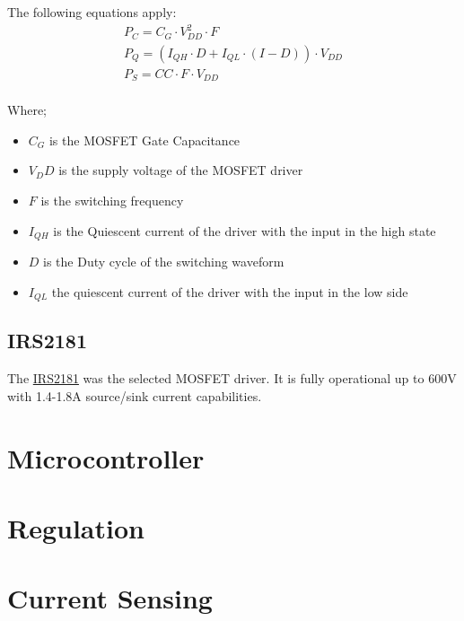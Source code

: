 \documentclass[a4paper]{article}
\begin{document}
The following equations apply:
    \begin{subequations}
        \begin{align}
        P_C = C_G\cdot V_{DD}^2\cdot F\\
        P_Q = \left( I_{QH}\cdot D + I_{QL}\cdot\left( I-D\right)\right)\cdot
        V_{DD}\\
        P_S = CC\cdot F\cdot V_{DD}\\
        \end{align}
    \end{subequations}

Where;
    \begin{itemize}
    \item $C_G$ is the MOSFET Gate Capacitance
    \item $V_DD$ is the supply voltage of the MOSFET driver
    \item $F$ is the switching frequency
    \item $I_{QH}$ is the Quiescent current of the driver with the input in the
    high state
    \item $D$ is the Duty cycle of the switching waveform
    \item $I_{QL}$ the quiescent current of the driver with the input in the low
    side
    \end{itemize}

\subsection{IRS2181}
The \href{http://www.irf.com/product-info/datasheets/data/irs2181.pdf}{IRS2181}
was the selected MOSFET driver. It is fully operational up to 600V with 1.4-1.8A
source/sink current capabilities.

\section{Microcontroller}

\section{Regulation}

\section{Current Sensing}
\end{document}

